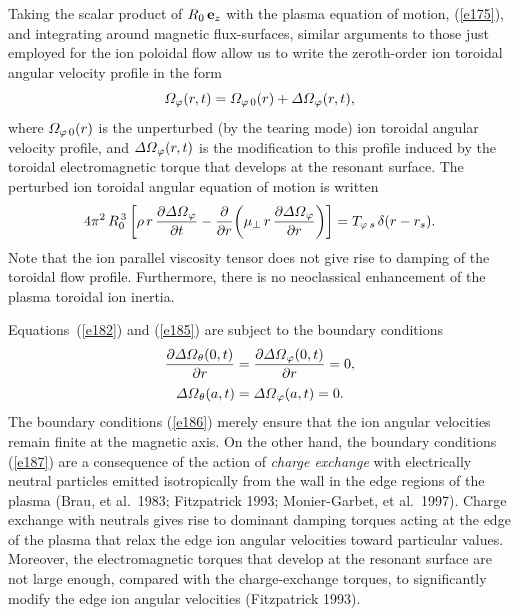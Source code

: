 \documentclass[notitlepage,12pt]{article}
\begin{document}
Taking the scalar product of  $R_0\,{\bf e}_z$ with the plasma equation of motion, (\ref{e175}), and integrating around magnetic
flux-surfaces, similar arguments to those just employed for the ion poloidal flow allow us to write the zeroth-order ion toroidal angular velocity profile in the form
\begin{equation}
{\mit\Omega}_\varphi(r,t)= {\mit\Omega}_{\varphi\,0}(r) + {\mit\Delta\Omega}_\varphi(r,t),
\end{equation}
where ${\mit\Omega}_{\varphi\,0}(r)$ is the 
unperturbed (by the tearing mode) ion toroidal angular velocity profile, and ${\mit\Delta\Omega}_{\varphi}(r,t)$ is the  modification to  this  profile
induced by the toroidal electromagnetic torque that develops at the resonant surface. The perturbed ion toroidal angular
equation of motion is written
\begin{equation}\label{e185}
4\pi^2\,R_0^{\,3}\left[\rho\,r\,\frac{\partial {\mit\Delta\Omega}_\varphi}{\partial t}-\frac{\partial}{\partial r}\!\left(\mu_\perp\,r\,\frac{\partial{\mit\Delta\Omega}_\varphi}{\partial r}\right)\right]
=T_{\varphi\,s}\,\delta(r-r_s).
\end{equation}
Note that the ion parallel viscosity tensor does not give rise to damping of the toroidal flow profile. Furthermore, there is  no
neoclassical enhancement of the plasma toroidal ion inertia. 

Equations~(\ref{e182}) and (\ref{e185}) are subject to the boundary conditions
\begin{align}\label{e186}
\frac{\partial{\mit\Delta\Omega}_\theta(0,t)}{\partial r} &= \frac{\partial{\mit\Delta\Omega}_\varphi(0,t)}{\partial r} =0,\\[0.5ex]
{\mit\Delta\Omega}_\theta(a,t) &= {\mit\Delta\Omega}_\varphi(a,t)=0.\label{e187}
\end{align}
The boundary conditions (\ref{e186}) merely ensure that the ion angular velocities remain finite at the magnetic axis. 
On the other  hand, the boundary conditions (\ref{e187}) are a consequence of the action of {\em charge exchange}\/ with electrically neutral particles emitted isotropically from the wall  in the edge regions of the plasma
(Brau, et al.\ 1983; Fitzpatrick 1993; Monier-Garbet, et al.\ 1997). Charge exchange with neutrals gives rise to 
dominant damping torques acting at the edge of the plasma that relax the edge ion angular velocities  toward  particular values. Moreover, the
electromagnetic torques that develop at the resonant surface are not large enough, compared with the charge-exchange torques,
to significantly modify the edge ion angular velocities (Fitzpatrick 1993). 
\end{document}
